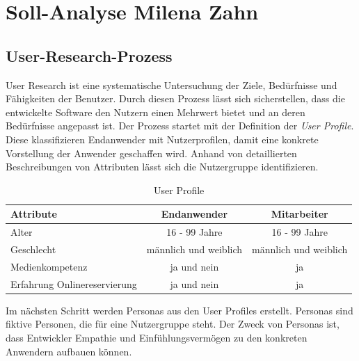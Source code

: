	\section[Soll-Analyse]{Soll-Analyse {\hfill \normalsize Milena Zahn}}
		
	 	\subsection{User-Research-Prozess} 
	 	User Research ist eine systematische Untersuchung der Ziele, Bedürfnisse und Fähigkeiten der Benutzer\autocite[Vgl.][S. 6]{Schumacher.2010}.
	 	Durch diesen Prozess lässt sich sicherstellen, dass die entwickelte Software den Nutzern einen Mehrwert bietet und an deren Bedürfnisse angepasst ist.
		Der Prozess startet mit der Definition der \textit{User Profile}. Diese klassifizieren Endanwender mit Nutzerprofilen, damit eine konkrete Vorstellung der Anwender geschaffen wird. Anhand von detaillierten Beschreibungen von Attributen lässt sich die Nutzergruppe identifizieren.
		
		\begin{table}[H]
			\centering
			\begin{tabular}{p{} || c | c }
				\textbf{Attribute} & \textbf{Endanwender} & \textbf{Mitarbeiter} \\\toprule
				Alter &  16 - 99 Jahre &  16 - 99 Jahre \\
				Geschlecht &  männlich und weiblich &  männlich und weiblich  \\
				Medienkompetenz &  ja und nein &  ja  \\
				Erfahrung Onlinereservierung &  ja und nein &  ja  \\
			\end{tabular}
			\caption[User Profile]{\label{tab:tabelleUserProfile}User Profile}
		\end{table}
		
		Im nächsten Schritt werden Personas aus den User Profiles erstellt. Personas sind fiktive Personen, die für eine Nutzergruppe steht. Der Zweck von Personas ist, dass Entwickler Empathie und Einfühlungsvermögen zu den konkreten Anwendern aufbauen können. 
		
